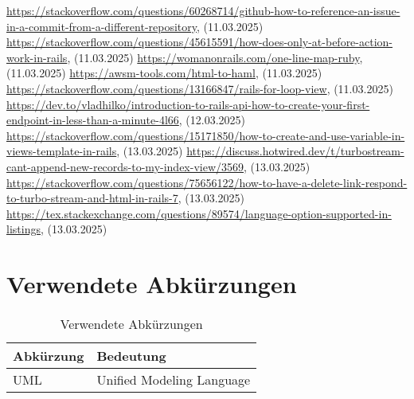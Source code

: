 \begin{thebibliography}{9}
     \url{https://stackoverflow.com/questions/60268714/github-how-to-reference-an-issue-in-a-commit-from-a-different-repository}, (11.03.2025)
     \url{https://stackoverflow.com/questions/45615591/how-does-only-at-before-action-work-in-rails}, (11.03.2025)
     \url{https://womanonrails.com/one-line-map-ruby}, (11.03.2025)
     \url{https://awsm-tools.com/html-to-haml}, (11.03.2025)
     \url{https://stackoverflow.com/questions/13166847/rails-for-loop-view}, (11.03.2025)
     \url{https://dev.to/vladhilko/introduction-to-rails-api-how-to-create-your-first-endpoint-in-less-than-a-minute-4l66}, (12.03.2025)
     \url{https://stackoverflow.com/questions/15171850/how-to-create-and-use-variable-in-views-template-in-rails}, (13.03.2025)
     \url{https://discuss.hotwired.dev/t/turbostream-cant-append-new-records-to-my-index-view/3569}, (13.03.2025)
     \url{https://stackoverflow.com/questions/75656122/how-to-have-a-delete-link-respond-to-turbo-stream-and-html-in-rails-7}, (13.03.2025)
     \url{https://tex.stackexchange.com/questions/89574/language-option-supported-in-listings}, (13.03.2025)
    
\end{thebibliography}

\chapter{Verwendete Abkürzungen}

\begin{table}[H]
    \begin{tabular}{|L{0.3\textwidth}|L{0.6\textwidth}|}
        \hline
         \textbf{\color{white}Abkürzung} & \textbf{\color{white}Bedeutung} \\[12pt]
        \hline
        UML & Unified Modeling Language \\
        \hline
    \end{tabular}
    \caption{Verwendete Abkürzungen}
\end{table}

